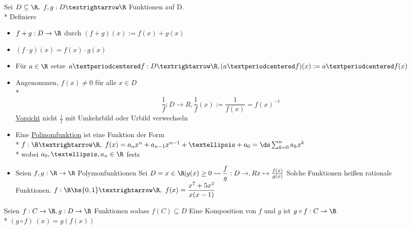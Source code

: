 %
Sei $D \subseteq \R , \ f,g: D→\R$ Funktionen auf D.\\*
Definiere
\begin{itemize}
\item{$f+g: D \to \R$ durch $(f + g)(x) := f(x) + g(x)$}
\item{$(f \cdot  g) (x) = f(x) \cdot g(x)$}
\item{Für $a\in\R$ setze $a·f: D→\R, (a·f)(x):=a·f(x)$}
\item{Angenommen, $f(x) \neq 0$ für alle $x \in D$ \\*
$$\frac{1}{f}: D \to R, \frac{1}{f}(x) := \frac{1}{f(x)} = f(x)^{-1}$$
\ul{Vorsicht} nicht $\frac{1}{f}$ mit Umkehrbild oder Urbild verwechseln}
\end{itemize}
%
\begin{itemize}
\item{Eine \ul{Polinomfunktion} ist eine Funktion der Form\\*
$f: \R → \R,\ f(x) = a_n x^n+a_{n-1}x^{n-1}+…+a_0=\ds\sum_{k=0}^n a_k x^k $\\*
wobei $a_0,…,a_n \in \R$ fest}s
%
\item{Seien $f, g : \R \to \R $ Polymonfunktionen
Sei $D = {x \in \R | g(x) \geq 0}\leadsto \dfrac{f}{g} : D \to , Rx \mapsto \frac{f(x)}{g(x)}$
Solche Funktionen heißen rationale Funktionen.
\bsp
$f:\R\bs\{0,1\}→\R, \ f(x)=\dfrac{x^7+5x^2}{x(x-1)}$}
\end{itemize}
Seien $f: C \to \R, g: D \to \R$ Funktionen sodass $f(C) \subseteq D$
Eine Komposition von $ f $ und $ g $ ist 
%
$g \circ f : C \to \R$\\*
$(g \circ f) \ (x) = g(f(x))$